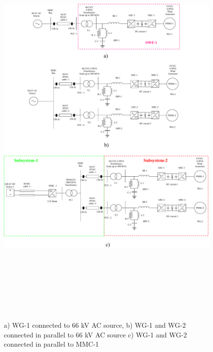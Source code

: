 





\begin{figure}[H]
    \includegraphics[height = 21cm,width = \textwidth]{Diagrams/Chapter_4/Steps_for_Scaling.pdf}
    \caption{a) WG-1 connected to 66 kV AC source, b) WG-1 and WG-2 connected in parallel to 66 kV AC source c) WG-1 and WG-2 connected in parallel to MMC-1}
    \label{fig:Steps_for_Scaling}
\end{figure}

